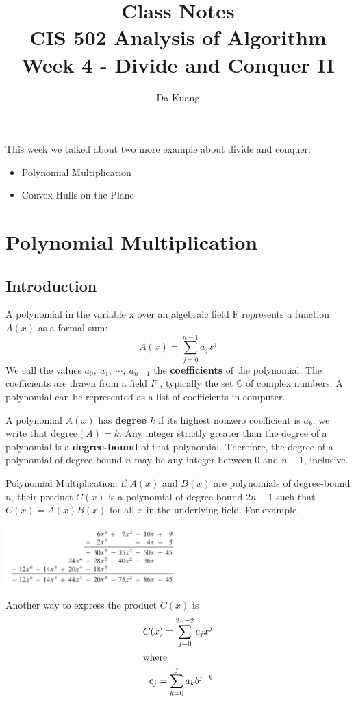 \documentclass[en,hazy,blue,screen,14pt]{elegantnote}
\title{Class Notes\\CIS 502 Analysis of Algorithm\\Week 4 - Divide and Conquer 
II}
\author{Da Kuang}
\institute{University of Pennsylvania}
\date{}
\begin{document}
\maketitle
\newpage
This week we talked about two more example about divide and conquer:
\begin{itemize}
 \item Polynomial Multiplication
 \item Convex Hulls on the Plane
\end{itemize}

\section{Polynomial Multiplication}
\subsection{Introduction}
A polynomial in the variable x over an algebraic field F represents a function 
$A(x)$ as a formal sum:
\[A(x) = \sum_{j = 0}^{n-1} a_j x^j\]
We call the values $a_0, ~a_1, ~\cdots, ~a_{n-1}$ the \textbf{coefficients} of 
the polynomial. The coefficients are drawn from a field $F$ , typically the set 
$\mathbb{C}$ of complex numbers. A polynomial can be represented as a list of 
coefficients in computer.

A polynomial $A(x)$ has \textbf{degree $k$} if its highest nonzero coefficient 
is $a_k$. we write that $\text{degree}(A) = k$. Any integer strictly greater 
than the degree of a polynomial is a \textbf{degree-bound }of that polynomial. 
Therefore, the degree of a polynomial of degree-bound $n$ may be any integer 
between $0$ and $n-1$, inclusive.

Polynomial Multiplication: if $A(x)$ and $B(x)$ are polynomials of degree-bound 
$n$, their product $C(x)$ is a polynomial of degree-bound $2n - 1$ such that
$C(x) = A(x)B(x)$ for all $x$ in the underlying field. For example,

\centerline{\includegraphics[width=0.5\textwidth]{poly-multiply.png}}

Another way to express the product $C(x)$ is
\begin{align*}
 C(x) = \sum_{j=0}^{2n-2} c_j x^j\\
 \intertext{where}
 c_j = \sum_{k=0}^j a_k b^{j-k}
\end{align*}
\end{document}
